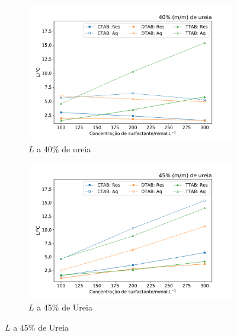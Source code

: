  		\begin{figure}[H]
		 	\centering
		 	\begin{subfigure}[t]{0.45\textwidth}
		 		\includegraphics[width=\textwidth]{./imagens/dsc/L_40p_1_300mM_aq_res}
		 		\caption{$L$ a 40\% de ureia}
		 		\label{fig:DSC_L_40pUr}
		 	\end{subfigure} \qquad %
		 	\begin{subfigure}[t]{0.45\textwidth}
		 		\includegraphics[width=\textwidth]{./imagens/dsc/L_45p_1_300mM_aq_res}
		 		\caption{$L$ a 45\% de Ureia}
		 		\label{fig:DSC_L_45pUr}
		 	\end{subfigure}
	 	

\end{figure}
